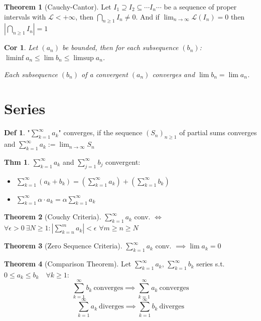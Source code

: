 \documentclass[a4paper, 10pt]{article}
\newtheorem*{corollary}{Cor}
\theoremstyle{definition}
\newtheorem*{theorem}{Thm}
\newtheorem*{definition}{Def}
\theoremstyle{named}
\newtheorem*{ntheorem_wrapper}{Theorem}
\newenvironment{ntheorem}%
    {\begin{mdframed}[style=important]\begin{ntheorem_wrapper}}%
    {\end{ntheorem_wrapper}\end{mdframed}}
\begin{document}
\begin{ntheorem}[Cauchy-Cantor]
    Let $I_1 \supseteq I_2 \subseteq \cdots I_n \cdots$ be a sequence of proper intervals with $\mathcal{L} < + \infty$, then $\bigcap_{n\geq1} I_n \neq 0$. And if $\lim_{n \to \infty} \mathcal{L}(I_n) = 0$ then $|\bigcap_{n\geq1} I_n| = 1$
\end{ntheorem}

\begin{corollary}
    Let $(a_n)$ be bounded, then for each subsequence $(b_n)$: $\liminf a_n \leq \lim b_n \leq \limsup a_n$.

    Each subsequence $(b_n)$ of a convergent $(a_n)$ converges and $\lim b_n = \lim a_n$.
\end{corollary}

\section{Series}
\begin{definition}
    "$\sum_{k=1}^\infty a_k$" converges, if the sequence $(S_n)_{n \geq 1}$ of partial sums converges and $\sum_{k=1}^\infty a_k := \lim_{n \to \infty} S_n$
\end{definition}

\begin{theorem}
    $\sum_{k = 1}^\infty a_k$ and $\sum_{j = 1}^\infty b_j$ convergent:
    \begin{itemize}
        \item $\sum_{k = 1}^\infty (a_k + b_k) = (\sum_{k = 1}^\infty a_k) + (\sum_{k = 1}^\infty b_k)$
        \item $\sum_{k = 1}^\infty \alpha \cdot a_k = \alpha \sum_{k = 1}^\infty a_k$
    \end{itemize}
\end{theorem}

\begin{ntheorem}[Couchy Criteria]
    $\sum_{k = 1}^\infty a_k$ conv. $\iff$ $\forall \epsilon > 0 \ \exists N \geq 1 : |\sum_{k = n}^m a_k| < \epsilon$ $\forall m\geq n \geq N$
\end{ntheorem}

\begin{ntheorem}[Zero Sequence Criteria]
    $\sum\limits_{k=1}^\infty a_k$ conv. $\implies \lim a_k = 0$
\end{ntheorem}

\begin{ntheorem}[Comparison Theorem]
    Let $\sum_{k = 1}^\infty a_k$, $\sum_{k = 1}^\infty b_k$ series s.t. $0 \leq a_k \leq b_k \quad \forall k \geq 1$:
    $$\sum_{k=1}^\infty b_k \ \text{converges} \implies \sum_{k = 1}^\infty a_k \ \text{converges}$$
    $$\sum_{k = 1}^\infty  a_k \ \text{diverges} \implies \sum_{k = 1}^\infty  b_k \ \text{diverges}$$
\end{ntheorem}
\end{document}
